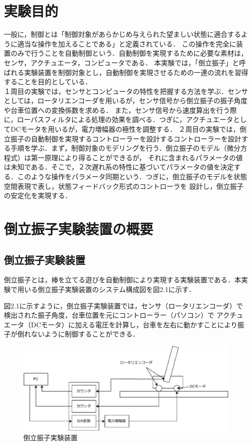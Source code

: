 
\section{実験目的}
一般に，制御とは「制御対象があらかじめ与えられた望ましい状態に適合するように適当な操作を加えることである」と定義されている．
この操作を完全に装置のみで行うことを自動制御という．自動制御を実現するために必要な素材は，センサ，アクチュエータ，コンピュータである．
本実験では，「倒立振子」と呼ばれる実験装置を制御対象とし，自動制御を実現させるための一連の流れを習得することを目的としている．\\
\quad １周目の実験では，センサとコンピュータの特性を把握する方法を学ぶ．センサとしては，ロータリエンコーダを用いるが，センサ信号から倒立振子の振子角度や台車位置への変換係数を求める．
また，センサ信号から速度算出を行う際に，ローパスフィルタによる処理の効果を調べる．つぎに，アクチュエータとしてDCモータを用いるが，電力増幅器の極性を調整する．
\quad ２周目の実験では，倒立振子の自動制御を実現するコントローラーを設計するコントローラーを設計する手順を学ぶ．まず，制御対象のモデリングを行う．倒立振子のモデル（微分方程式）は第一原理により得ることができるが，
それに含まれるパラメータの値は未知である．そこで，２次遅れ系の特性に基づいてパラメータの値を決定する．このような操作をパラメータ同期という．つぎに，倒立振子のモデルを状態空間表現で表し，状態フィードバック形式のコントローラを
設計し，倒立振子の安定化を実現する．

\section{倒立振子実験装置の概要}
\subsection{倒立振子実験装置}
倒立振子とは，棒を立てる遊びを自動制御により実現する実験装置である．本実験で用いる倒立振子実験装置のシステム構成図を図2.1に示す．

\quad 図2.1に示すように，倒立振子実験装置では，センサ（ロータリエンコーダ）で検出された振子角度，台車位置を元にコントローラー（パソコン）で
アクチュエータ（DCモータ）に加える電圧を計算し，台車を左右に動かすことにより振子が倒れないように制御することができる．

\begin{figure}[H]
  \centering
  \includegraphics[scale=0.8]{sozai/touritu.pdf}
  \caption{倒立振子実験装置}
\end{figure}

